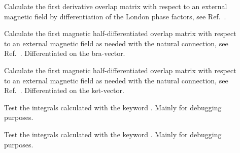 \begin{description}
\item[] Calculate the first derivative overlap
matrix with respect to an
external magnetic field by differentiation
of the London phase factors, see Ref.~\cite{thpjjcp95}.


\item[] Calculate the first magnetic half-differentiated overlap
matrix with respect to an
external magnetic field as needed with the
natural connection, see
Ref.~\cite{krthklbpjjocp195}. Differentiated
on the bra-vector.


\item[] Calculate the first magnetic half-differentiated overlap
matrix with respect to an external magnetic field as needed with the
natural connection, see Ref.~\cite{krthklbpjjocp195}. Differentiated on
the ket-vector.


\item[] Test the integrals calculated with the keyword
. Mainly for debugging purposes.

\item[] Test the integrals calculated with the keyword
. Mainly for debugging purposes.


\end{description}
